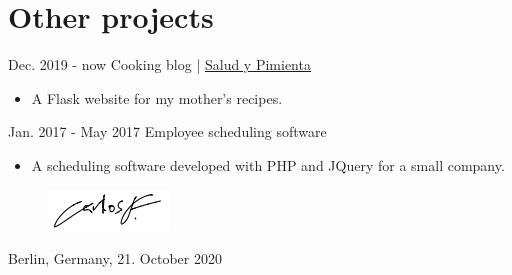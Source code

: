 \documentclass[]{commands}
\begin{document}
\section{Other projects}
\begin{entrylist}
 
   \entry
    {Dec. 2019 - now}
    {Cooking blog | }
    {\href{https://www.saludypimienta.com/}{\small Salud y Pimienta \faMousePointer}}
    {}
    {\jobspace
    \begin{itemize}[leftmargin=*, itemsep = 0.1em]
        \item A Flask website for my mother's recipes.\\
    \end{itemize}}
    
   \entry
    {Jan. 2017 - May 2017}
    {Employee scheduling software}
    {}
    {}
    {\jobspace
    \begin{itemize}[leftmargin=*, itemsep = 0.1em]
        \item A scheduling software developed with PHP and JQuery for a small company.\\
    \end{itemize}}
    \vspace{-4mm}
\end{entrylist}

\begin{figure}[H]
\hspace{11cm}
\includegraphics{img/signature.png}
\end{figure}
\vspace{-0.8cm}
\hspace{8.5cm} Berlin, Germany, 21. October 2020
\end{document}
